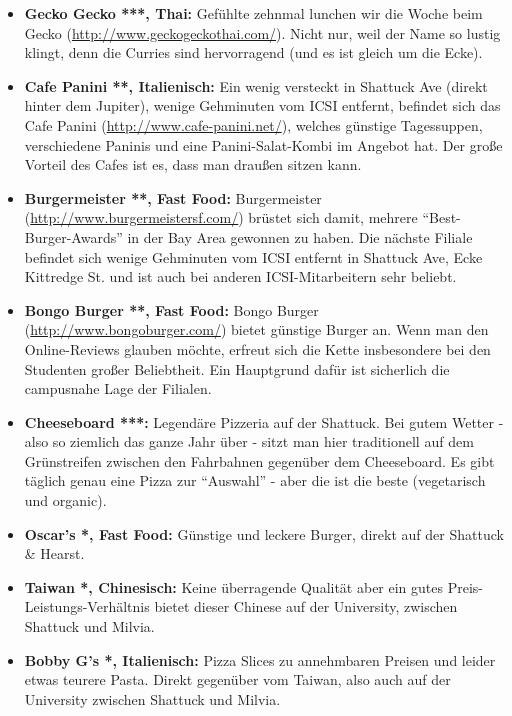 \documentclass[a4paper]{scrreprt}
\begin{document}
\begin{itemize}
  \item \textbf{Gecko Gecko ***, Thai:} Gefühlte zehnmal lunchen wir die Woche beim Gecko (\url{http://www.geckogeckothai.com/}). Nicht nur, weil der Name so lustig klingt, denn die Curries sind hervorragend (und es ist gleich um die Ecke).

	\item \textbf{Cafe Panini **, Italienisch:} Ein wenig versteckt in Shattuck Ave (direkt hinter dem Jupiter), wenige Gehminuten vom ICSI entfernt, befindet sich das Cafe Panini (\url{http://www.cafe-panini.net/}), welches günstige Tagessuppen, verschiedene Paninis und eine Panini-Salat-Kombi im Angebot hat. Der große Vorteil des Cafes ist es, dass man draußen sitzen kann.

  \item \textbf{Burgermeister **, Fast Food:} Burgermeister (\url{http://www.burgermeistersf.com/}) brüstet sich damit, mehrere	 "`Best-Burger-Awards"' in der Bay Area gewonnen zu haben. Die nächste Filiale befindet sich wenige Gehminuten vom ICSI entfernt in Shattuck Ave, Ecke Kittredge St. und ist auch bei anderen ICSI-Mitarbeitern sehr beliebt.

  \item \textbf{Bongo Burger **, Fast Food:} Bongo Burger (\url{http://www.bongoburger.com/}) bietet günstige Burger an. Wenn man den Online-Reviews glauben möchte, erfreut sich die Kette insbesondere bei den Studenten großer Beliebtheit. Ein Hauptgrund dafür ist sicherlich die campusnahe Lage der Filialen.

	\item \textbf{Cheeseboard ***:} Legendäre Pizzeria auf der Shattuck. Bei gutem Wetter - also so ziemlich das ganze Jahr über - sitzt man hier traditionell auf dem Grünstreifen zwischen den Fahrbahnen gegenüber dem Cheeseboard. Es gibt täglich genau eine Pizza zur "`Auswahl"' - aber die ist die beste (vegetarisch und organic).

  \item \textbf{Oscar's *, Fast Food:} Günstige und leckere Burger, direkt auf der Shattuck \& Hearst.

	\item \textbf{Taiwan *, Chinesisch:} Keine überragende Qualität aber ein gutes Preis-Leistungs-Verhältnis bietet dieser Chinese auf der University, zwischen Shattuck und Milvia.

	\item \textbf{Bobby G's *, Italienisch:} Pizza Slices zu annehmbaren Preisen und leider etwas teurere Pasta. Direkt gegenüber vom Taiwan, also auch auf der University zwischen Shattuck und Milvia.
  

\end{itemize}
\end{document}
